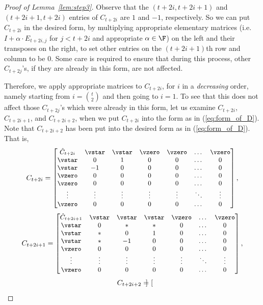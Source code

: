 \begin{proof}[Proof of Lemma~\ref{lem:step3}]
Observe that the $(t+2i, t+2i+1)$ and 
$(t+2i+1, t+2i)$ entries of $C_{t+2i}$ are $1$ and $-1$, respectively. So we can 
put $C_{t+2i}$ in the desired form, by multiplying appropriate elementary 
matrices  
(i.e. $I+\alpha\cdot E_{t+2i, j}$ for $j<t+2i$ and appropriate $\alpha\in\F$) on 
the left and their transposes on the right, 
to set other entries on the $(t+2i+1)$th row and 
column to be $0$. 
%
Some 
care is required to ensure that during 
this process, other $C_{t+2j}$'s, if they are already in this form, are not 
affected. 

Therefore, we apply appropriate matrices to 
%
$C_{t+2i}$, 
for $i$ in a \emph{decreasing} order, namely starting from $i=\binom{t}{2}$ and 
then 
going to $i=1$. To see that this does not affect those $C_{t+2j}$'s which were 
already in this form, let us examine $C_{t+2i}$, $C_{t+2i+1}$, and $C_{t+2i+2}$, 
when we put 
$C_{t+2i}$ into the form as in (\ref{eq:form_of_D}). Note that $C_{t+2i+2}$ 
has 
been put into the desired form as in (\ref{eq:form_of_D}). That is, 
$${\small
C_{t+2i}=\begin{bmatrix}
\hat C_{t+2i} & \vstar & \vstar & \vzero & \vzero& \dots & \vzero \\
\vstar & 0 & 1 & 0 & 0 & \dots & 0 \\
\vstar & -1 & 0 & 0 & 0 & \dots & 0 \\
\vzero & 0 & 0 & 0 & 0 & \dots & 0 \\
\vzero & 0 & 0 & 0 & 0 & \dots & 0 \\
\vdots & \vdots & \vdots & \vdots &\vdots & \ddots & \vdots \\
\vzero & 0 & 0 & 0 & 0 &\dots & 0 
\end{bmatrix},}$$
$${\small
C_{t+2i+1}=\begin{bmatrix}
\hat C_{t+2i+1} & \vstar & \vstar &  \vstar & \vzero & \dots & \vzero \\
\vstar & 0 & * & * & 0 &\dots & 0 \\
\vstar & * & 0 & 1 & 0 & \dots & 0 \\
\vstar & * & -1 & 0 & 0 & \dots & 0 \\
\vzero & 0 & 0 & 0 & 0 & \dots & 0 \\
\vdots & \vdots & \vdots & \vdots &\vdots & \ddots & \vdots \\
\vzero & 0 & 0 & 0 & 0 &\dots & 0 
\end{bmatrix},}$$
$${\small 
C_{t+2i+2}=\begin{bmatrix}

\end{bmatrix}}$$
\end{proof}
